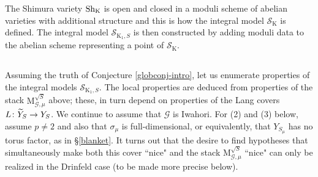 \documentclass[reqno, 10pt]{amsart}
\makeatletter
\newcommand{\CG}{\ensuremath{\mathcal {G}}\xspace}
\newcommand{\CS}{\ensuremath{\mathcal {S}}\xspace}
\newcommand{\RK}{\ensuremath{\mathrm {K}}\xspace}
\newcommand{\wt}{\widetilde}
\theoremstyle{definition}
\numberwithin{equation}{subsection}
\numberwithin{subsubsection}{subsection}
\renewcommand{\to}{%
   \ifbool{@display}{\longrightarrow}{\rightarrow}%
   }
\newcommand{\Mlocroot}{{\mathrm M}^{\sqrt{S}}}
\makeatother
\begin{document}
  
 
 
 
 The Shimura variety ${\rm Sh}_\RK$ is open and closed in a moduli scheme of abelian varieties with additional structure and this is how the integral model $\CS_\RK$ is defined.
  The integral model $\CS_{\RK_1, S}$ is then constructed by adding moduli data to the abelian scheme representing a point of $\CS_\RK$. 
 

\subsection{}  Assuming the truth of Conjecture \ref{globconj-intro}, let us enumerate properties of the integral models $\CS_{\RK_1, S}$. The local  properties are deduced from properties of the stack   $\Mlocroot_{\CG,\mu}$ above; these, in turn depend on properties of the Lang covers $L\colon \wt Y_S\to Y_S$.
 We continue to assume that $\CG$ is Iwahori. For (2) and (3) below, assume  $p\neq 2$ and also that
 $\sigma_\mu$ is full-dimensional, or equivalently, that $Y_{S_\mu}$ has no torus factor, as in \S \ref{blanket}. It turns out that the desire to find hypotheses that simultaneously  make both this cover ``nice" and the  
 stack   $\Mlocroot_{\CG,\mu}$ ``nice" can only be realized in the Drinfeld case (to be made more precise below).
 
\end{document}
